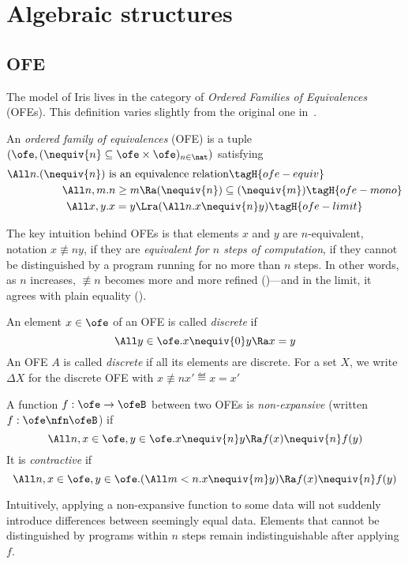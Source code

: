 \section{Algebraic structures}

\subsection{OFE}

The model of Iris lives in the category of \emph{Ordered Families of Equivalences} (OFEs).
This definition varies slightly from the original one in~\cite{catlogic}.

\begin{defn}
  An \emph{ordered family of equivalences} (OFE) is a tuple $(\ofe, ({\nequiv{n}} \subseteq \ofe \times \ofe)_{n \in \nat})$ satisfying
  \begin{align*}
    \All n. (\nequiv{n}) ~& \text{is an equivalence relation} \tagH{ofe-equiv} \\
    \All n, m.& n \geq m \Ra (\nequiv{n}) \subseteq (\nequiv{m}) \tagH{ofe-mono} \\
    \All x, y.& x = y \Lra (\All n. x \nequiv{n} y) \tagH{ofe-limit}
  \end{align*}
\end{defn}

The key intuition behind OFEs is that elements $x$ and $y$ are $n$-equivalent, notation $x \nequiv{n} y$, if they are \emph{equivalent for $n$ steps of computation}, \ie if they cannot be distinguished by a program running for no more than $n$ steps.
In other words, as $n$ increases, $\nequiv{n}$ becomes more and more refined ()---and in the limit, it agrees with plain equality ().

\begin{defn}
  An element $x \in \ofe$ of an OFE is called \emph{discrete} if
  \[ \All y \in \ofe. x \nequiv{0} y \Ra x = y\]
  An OFE $A$ is called \emph{discrete} if all its elements are discrete.
  For a set $X$, we write $\Delta X$ for the discrete OFE with $x \nequiv{n} x' \eqdef x = x'$
\end{defn}

\begin{defn}
  A function $f : \ofe \to \ofeB$ between two OFEs is \emph{non-expansive} (written $f : \ofe \nfn \ofeB$) if
  \[\All n, x \in \ofe, y \in \ofe. x \nequiv{n} y \Ra f(x) \nequiv{n} f(y) \]
  It is \emph{contractive} if
  \[ \All n, x \in \ofe, y \in \ofe. (\All m < n. x \nequiv{m} y) \Ra f(x) \nequiv{n} f(y) \]
\end{defn}
Intuitively, applying a non-expansive function to some data will not suddenly introduce differences between seemingly equal data.
Elements that cannot be distinguished by programs within $n$ steps remain indistinguishable after applying $f$.

